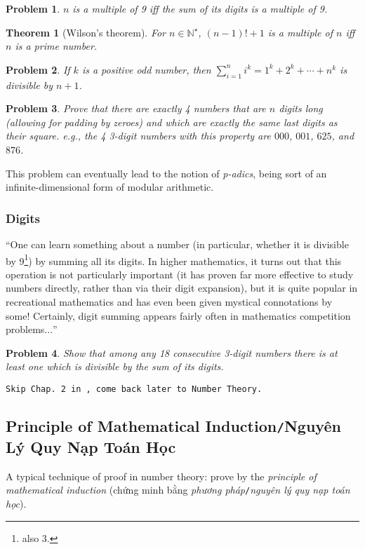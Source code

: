 \documentclass{article}
\numberwithin{equation}{section}
\newtheorem{theorem}{Theorem}[section]
\newtheorem{problem}{Problem}[section]
\begin{document}
\begin{problem}
	$n$ is a multiple of 9 iff the sum of its digits is a multiple of 9.
\end{problem}

\begin{theorem}[Wilson's theorem]
	For $n\in\mathbb{N}^\star$, $(n - 1)! + 1$ is a multiple of $n$ iff $n$ is a prime number.
\end{theorem}

\begin{problem}
	If $k$ is a positive odd number, then $\sum_{i=1}^n i^k = 1^k + 2^k + \cdots + n^k$ is divisible by $n + 1$.
\end{problem}

\begin{problem}
	Prove that there are exactly 4 numbers that are $n$ digits long (allowing for padding by zeroes) and which are exactly the same last digits as their square. e.g., the 4 3-digit numbers with this property are $000$, $001$, $625$, and $876$.
\end{problem}
This problem can eventually lead to the notion of \textit{p-adics}, being sort of an infinite-dimensional form of modular arithmetic.

\subsubsection{Digits}
``One can learn something about a number (in particular, whether it is divisible by 9\footnote{also 3.}) by summing all its digits. In higher mathematics, it turns out that this operation is not particularly important (it has proven far more effective to study numbers directly, rather than
via their digit expansion), but it is quite popular in recreational mathematics and has even been given mystical connotations by some! Certainly, digit summing appears fairly often in mathematics competition problems$\ldots$''

\begin{problem}
	Show that among any 18 consecutive 3-digit numbers there is at least one which is divisible by the sum of its digits.
\end{problem}
\texttt{Skip Chap. 2 in \cite{Tao2006}, come back later to Number Theory.}

\subsection{Principle of Mathematical Induction\texttt{/}Nguyên Lý Quy Nạp Toán Học}
A typical technique of proof in number theory: prove by the \textit{principle of mathematical induction} (chứng minh bằng \textit{phương pháp}\texttt{/}\textit{nguyên lý quy nạp toán học}).
\end{document}
